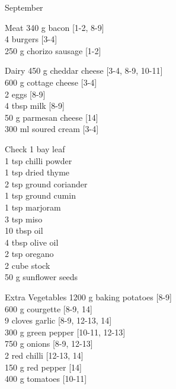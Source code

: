 \begin{menu}{September}
      \begin{shoppinglist}{Meat}
      340 g bacon {\scriptsize[1-2, 8-9]}\\
      4  burgers {\scriptsize[3-4]}\\
      250 g chorizo sausage {\scriptsize[1-2]}\\
      \end{shoppinglist}%
      \begin{shoppinglist}{Dairy}
      450 g cheddar cheese {\scriptsize[3-4, 8-9, 10-11]}\\
      600 g cottage cheese {\scriptsize[3-4]}\\
      2  eggs {\scriptsize[8-9]}\\
      4 tbsp milk {\scriptsize[8-9]}\\
      50 g parmesan cheese {\scriptsize[14]}\\
      300 ml soured cream {\scriptsize[3-4]}\\
      \end{shoppinglist}%
      \par\vfil %
      \vfil\clearpage %
      \begin{shoppinglist}{Check}
      1  bay leaf \\
      1 tsp chilli powder \\
      1 tsp dried thyme \\
      2 tsp ground coriander \\
      1 tsp ground cumin \\
      1 tsp marjoram \\
      3 tsp miso \\
      10 tbsp oil \\
      4 tbsp olive oil \\
      2 tsp oregano \\
      2 cube stock \\
      50 g sunflower seeds \\
      \end{shoppinglist}%
      \begin{shoppinglist}{Extra Vegetables}
      1200 g baking potatoes {\scriptsize[8-9]}\\
      600 g courgette {\scriptsize[8-9, 14]}\\
      9 cloves garlic {\scriptsize[8-9, 12-13, 14]}\\
      300 g green pepper {\scriptsize[10-11, 12-13]}\\
      750 g onions {\scriptsize[8-9, 12-13]}\\
      2  red chilli {\scriptsize[12-13, 14]}\\
      150 g red pepper {\scriptsize[14]}\\
      400 g tomatoes {\scriptsize[10-11]}\\
      \end{shoppinglist}%
      \par\vfil %
    \vfil\clearpage
  

\end{menu}
